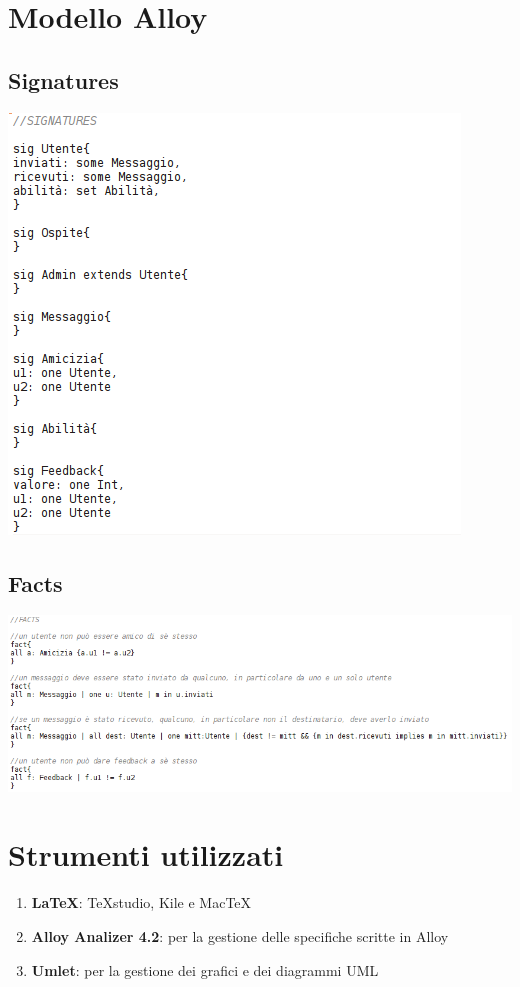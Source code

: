 \documentclass[a4paper,12pt]{article}
\begin{document}
\section{Modello Alloy}
\subsection{Signatures}
\includegraphics[scale=0.6]{signatures.png}
\subsection{Facts}
\includegraphics[scale=0.6]{facts.png} \\
\clearpage
\section{Strumenti utilizzati}
\begin{enumerate}
\itemsep0em
\item \textbf{\LaTeX}: TeXstudio, Kile e MacTeX
\item \textbf{Alloy Analizer 4.2}: per la gestione delle specifiche scritte in Alloy
\item \textbf{Umlet}: per la gestione dei grafici e dei diagrammi UML
\end{enumerate}
\end{document}
